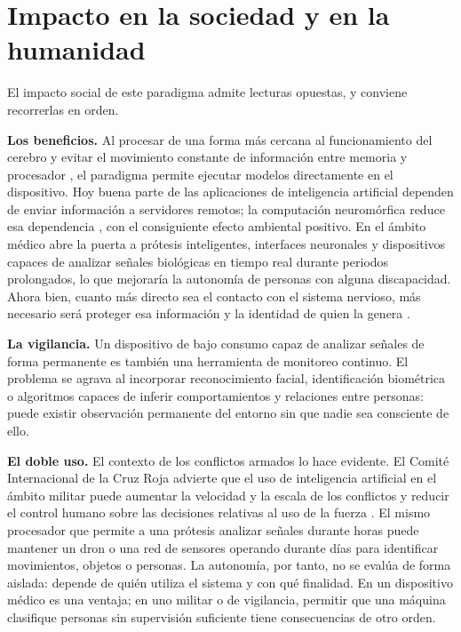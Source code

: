 \documentclass[a4paper,11pt,oneside]{book}
\begin{document}
\section{Impacto en la sociedad y en la humanidad}
\label{sec:impacto}

El impacto social de este paradigma admite lecturas opuestas, y conviene
recorrerlas en orden.

\textbf{Los beneficios.} Al procesar de una forma más cercana al funcionamiento
del cerebro y evitar el movimiento constante de información entre memoria y
procesador \parencite{roy2019}, el paradigma permite ejecutar modelos
directamente en el dispositivo. Hoy buena parte de las aplicaciones de
inteligencia artificial dependen de enviar información a servidores remotos; la
computación neuromórfica reduce esa dependencia \parencite{schuman2022}, con el
consiguiente efecto ambiental positivo. En el ámbito médico abre la puerta a
prótesis inteligentes, interfaces neuronales y dispositivos capaces de analizar
señales biológicas en tiempo real durante periodos prolongados, lo que mejoraría
la autonomía de personas con alguna discapacidad. Ahora bien, cuanto más directo
sea el contacto con el sistema nervioso, más necesario será proteger esa
información y la identidad de quien la genera \parencite{yuste2017}.

\textbf{La vigilancia.} Un dispositivo de bajo consumo capaz de analizar señales
de forma permanente es también una herramienta de monitoreo continuo. El
problema se agrava al incorporar reconocimiento facial, identificación
biométrica o algoritmos capaces de inferir comportamientos y relaciones entre
personas: puede existir observación permanente del entorno sin que nadie sea
consciente de ello.

\textbf{El doble uso.} El contexto de los conflictos armados lo hace evidente. El
Comité Internacional de la Cruz Roja advierte que el uso de inteligencia
artificial en el ámbito militar puede aumentar la velocidad y la escala de los
conflictos y reducir el control humano sobre las decisiones relativas al uso de
la fuerza \parencite{icrc2026ai}. El mismo procesador que permite a una prótesis
analizar señales durante horas puede mantener un dron o una red de sensores
operando durante días para identificar movimientos, objetos o personas. La
autonomía, por tanto, no se evalúa de forma aislada: depende de quién utiliza el
sistema y con qué finalidad. En un dispositivo médico es una ventaja; en uno
militar o de vigilancia, permitir que una máquina clasifique personas sin
supervisión suficiente tiene consecuencias de otro orden.
\end{document}
